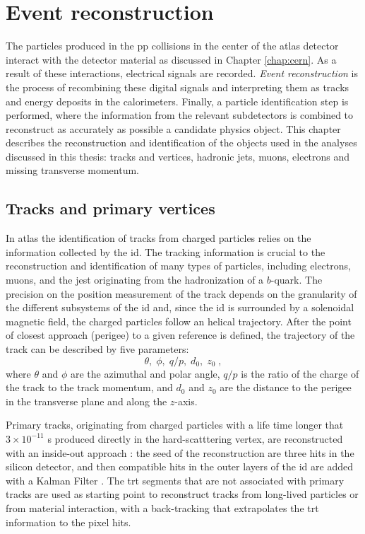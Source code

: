 \chapter{Event reconstruction}
\label{sec:event:reco}

The particles produced in the \gls{pp} collisions in the center of the \gls{atlas} detector interact with the detector material as discussed in Chapter \ref{chap:cern}. As a result of these interactions, electrical signals are recorded. \textit{Event reconstruction} is the process of recombining these digital signals and interpreting them as tracks and energy deposits in the calorimeters. Finally, a particle identification step
is performed, where the information from the relevant subdetectors is combined to reconstruct as accurately
as possible a candidate physics object.
This chapter describes the reconstruction and identification of the objects used in the analyses discussed in this thesis: tracks and vertices, hadronic jets, muons, electrons and missing transverse momentum. 


\section{Tracks and primary vertices}
\label{sec:reco:tracks}

In \gls{atlas} the identification of tracks from charged particles relies on the information collected by the \gls{id}. The tracking information is crucial to the reconstruction and identification of many types of particles, including electrons, muons, and the jest originating from the hadronization of a $b$-quark. The precision on the position measurement of the track depends on the granularity of the different subsystems of the \gls{id} and, since the \gls{id} is surrounded by a solenoidal magnetic field, the charged particles follow an helical trajectory. After the point of closest approach (perigee) to a given reference is defined, the trajectory of the track can be described by five parameters: 
\begin{equation}
\theta, \; \phi, \; q/p, \; d_0, \; z_0 \;,
\end{equation}
\noindent where $\theta$ and $\phi$ are the azimuthal and polar angle, $q/p$ is the ratio of the charge of the track to the track momentum, and $d_0$ and $z_0$ are the distance to the perigee in the transverse plane and along the $z$-axis. 

Primary tracks, originating from charged particles with a life time longer that $3 \times 10^{-11}$ s produced directly in the hard-scatttering vertex, are reconstructed with an inside-out approach \cite{Cornelissen:1020106}: the seed of the reconstruction are three hits in the silicon detector, and then compatible hits in the outer layers of the \gls{id} are added with a Kalman Filter \cite{citeulike:347166,Fruhwirth:1987fm}. The \gls{trt} segments that are not associated with primary tracks are used as starting point to reconstruct tracks from long-lived particles or from material interaction, with a back-tracking that extrapolates the \gls{trt} information to the pixel hits. 


